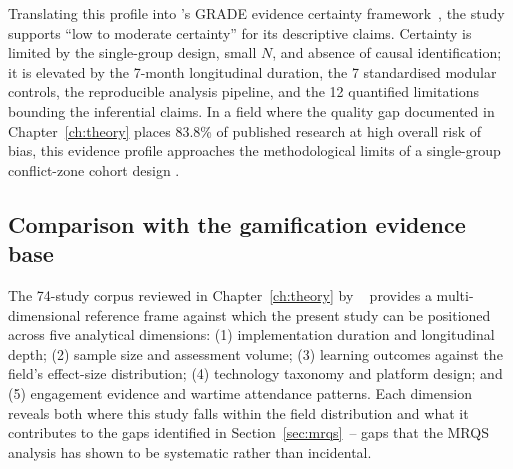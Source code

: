Translating this profile into \citeauthor{GuyattGRADE2008}'s GRADE evidence certainty framework~\cite{GuyattGRADE2008}, the study supports ``low to moderate certainty'' for its descriptive claims. Certainty is limited by the single-group design, small $N$, and absence of causal identification; it is elevated by the 7-month longitudinal duration, the 7 standardised modular controls, the reproducible analysis pipeline, and the 12 quantified limitations bounding the inferential claims. In a field where the quality gap documented in Chapter~\ref{ch:theory} places 83.8\% of published research at high overall risk of bias, this evidence profile approaches the methodological limits of a single-group conflict-zone cohort design \cite{KorniienkoSemerikov2024}.

\subsection{Comparison with the gamification evidence base}

The 74-study corpus reviewed in Chapter~\ref{ch:theory} by \citeauthor{KorniienkoSemerikov2024}~\cite{KorniienkoSemerikov2024}
provides a multi-dimensional reference frame against which the present study can be
positioned across five analytical dimensions: (1) implementation duration and longitudinal
depth; (2) sample size and assessment volume; (3) learning outcomes against the field's
effect-size distribution; (4) technology taxonomy and platform design; and (5) engagement
evidence and wartime attendance patterns. Each dimension reveals both where this study
falls within the field distribution and what it contributes to the gaps identified in
Section~\ref{sec:mrqs}~-- gaps that the MRQS analysis \cite{Korniienko2025mrqs} has
shown to be systematic rather than incidental.

